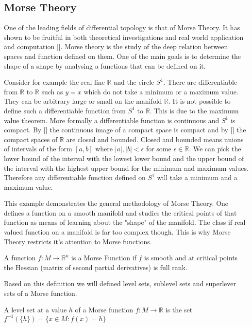 \subsection{Morse Theory}

One of the leading fields of differential topology is that of Morse Theory. It has shown to be fruitful in both theoretical investigations and real world application and computation []. Morse theory is the study of the deep relation between spaces and function defined on them. One of the main goals is to determine the shape of a shape by analysing a functions that can be defined on it. 

Consider for example the real line $\mathbb{R}$ and the circle $S^1$. There are differentiable from $\mathbb{R}$ to $\mathbb{R}$ such as $y = x$ which do not take a minimum or a maximum value. They can be arbitrary large or small on the manifold $\mathbb{R}$. It is not possible to define such a differentiable function from $S^1$ to $\mathbb{R}$. This is due to the maximum value theorem. More formally a differentiable function is continuous and $S^1$ is compact. By [] the continuous image of a compact space is compact and by [] the compact spaces of $\mathbb{R}$ are closed and bounded. Closed and bounded means unions of intervals of the form $[a, b]$ where $|a|, |b| < \epsilon$ for some $\epsilon \in \mathbb{R}$. We can pick the lower bound of the interval with the lowest lower bound and the upper bound of the interval with the highest upper bound for the minimum and maximum values. Therefore any differentiable function defined on $S^1$ will take a minimum and a maximum value.

This example demonstrates the general methodology of Morse Theory. One defines a function on a smooth manifold and studies the critical points of that function as means of learning about the "shape" of the manifold. The class if real valued function on a manifold is far too complex though. This is why Morse Theory restricts it's attention to Morse functions.


\begin{defn} A function $f: M \to \mathbb{R}^n$ is a Morse Function if $f$ is smooth and at critical points the Hessian (matrix of second partial derivatives) is full rank.   \end{defn}

Based on this definition we will defined level sets, sublevel sets and superlever sets of a Morse function.

\begin{defn} A level set at a value $h$ of a Morse function $f: M \to \mathbb{R}$ is the set $f^{-1}(\{h\}) = \{x \in M: f(x) = h \}$   \end{defn}

